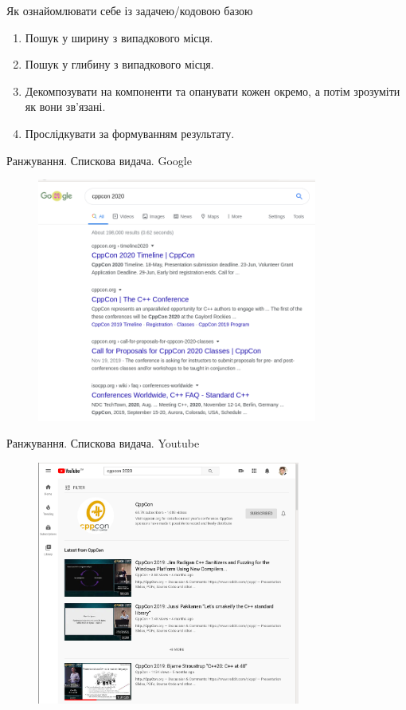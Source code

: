\documentclass[10pt]{beamer}
\begin{document}
\begin{frame}{Як ознайомлювати себе із задачею/кодовою базою}
\begin{enumerate}
    \item Пошук у ширину з випадкового місця.
    \item Пошук у глибину з випадкового місця.
    \item Декомпозувати на компоненти та опанувати кожен окремо, а потім зрозуміти як вони зв'язані.
    \item Прослідкувати за формуванням результату.
\end{enumerate}
\end{frame}


\begin{frame}{Ранжування. Спискова видача. Google}
        \begin{center}
            \begin{figure}
            \includegraphics[height=8cm,natwidth=788,natheight=684]{images/search-results.cppcon_2020.google.png}
            \end{figure}
        \end{center}
\end{frame}

\begin{frame}{Ранжування. Спискова видача. Youtube}
        \begin{center}
            \begin{figure}
            \includegraphics[height=8cm,natwidth=961,natheight=888]{images/search-results.cppcon_2020.youtube.png}
            \end{figure}
        \end{center}
\end{frame}
\end{document}
